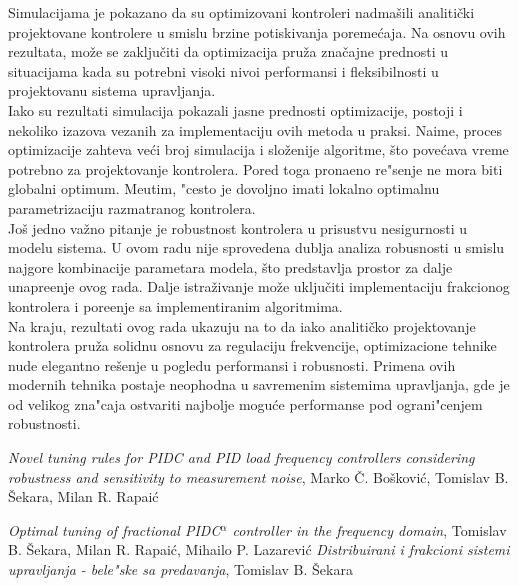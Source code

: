 \documentclass[a4paper,11pt]{article}
\theoremstyle{definition} \newtheorem{deff}{Definicija}[section]
\theoremstyle{definition} \newtheorem{prim}[deff]{Primer}
\theoremstyle{plain} \newtheorem{teor}[deff]{Teorema}
\begin{document}
	Simulacijama je pokazano da su optimizovani kontroleri nadmašili analitički projektovane kontrolere u smislu brzine potiskivanja poreme\'caja. Na osnovu ovih rezultata, može se zaključiti da optimizacija pruža značajne prednosti u situacijama kada su potrebni visoki nivoi performansi i fleksibilnosti u projektovanu sistema upravljanja. \\
	
	Iako su rezultati simulacija pokazali jasne prednosti optimizacije, postoji i nekoliko izazova vezanih za implementaciju ovih metoda u praksi. Naime, proces optimizacije zahteva veći broj simulacija i složenije algoritme, što povećava vreme potrebno za projektovanje kontrolera. Pored toga prona\dj{}eno re"senje ne mora biti globalni optimum. Me\dj{}utim, "cesto je dovoljno imati lokalno optimalnu parametrizaciju razmatranog kontrolera. \\
	
	Još jedno važno pitanje je robustnost kontrolera u prisustvu nesigurnosti u modelu sistema. U ovom radu nije sprovedena dublja analiza robusnosti u smislu najgore kombinacije parametara modela, što predstavlja prostor za dalje unapre\dj{}enje ovog rada. Dalje istraživanje može uključiti implementaciju frakcionog kontrolera i pore\dj{}enje sa implementiranim algoritmima. \\
	
	
	Na kraju, rezultati ovog rada ukazuju na to da iako analitičko projektovanje kontrolera pruža solidnu osnovu za regulaciju frekvencije, optimizacione tehnike nude elegantno rešenje u pogledu performansi i robusnosti. Primena ovih modernih tehnika postaje neophodna u savremenim sistemima upravljanja, gde je od velikog zna"caja ostvariti najbolje mogu\'ce performanse pod ograni"cenjem robustnosti.
	
	
	
	
	
	
	\newpage
	
	\begin{thebibliography}{9}
		\emph{ Novel tuning rules for PIDC and PID load frequency controllers considering
			robustness and sensitivity to measurement noise}, Marko Č. Bošković, Tomislav B. Šekara, Milan R. Rapaić
		
		\emph{Optimal tuning of fractional PIDC$^\alpha$ controller in the frequency domain}, Tomislav B. Šekara, Milan R. Rapaić, Mihailo P. Lazarevi\'c
		\emph{Distribuirani i frakcioni sistemi upravljanja - bele"ske sa predavanja}, 
		Tomislav B. Šekara
		
		
	\end{thebibliography}
\end{document}
